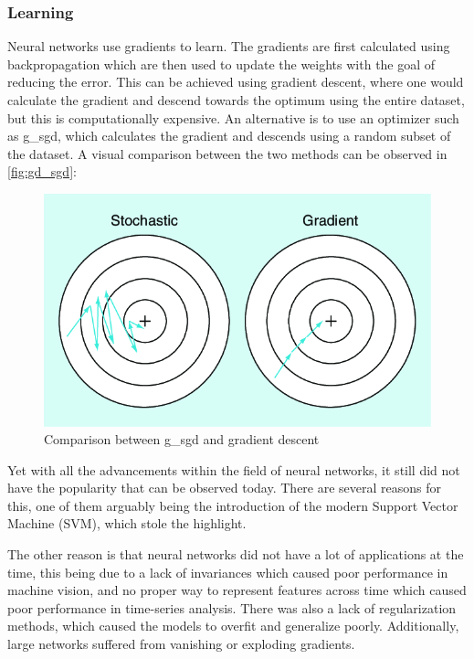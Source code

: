 \subsubsection{Learning}
Neural networks use gradients to learn. The gradients are first calculated using backpropagation which are then used to update the weights with the goal of reducing the error. This can be achieved using gradient descent, where one would calculate the gradient and descend towards the optimum using the entire dataset, but this is computationally expensive. An alternative is to use an optimizer such as \gls*{g_sgd}\cite{sgd}, which calculates the gradient and descends using a random subset of the dataset. A visual comparison between the two methods can be observed in \autoref{fig:gd_sgd}:
\begin{figure}[H]
    \centering
    \includegraphics[width=0.8\linewidth]{resources/related_works/gradient_descent.png}
    \caption{Comparison between \gls*{g_sgd} and gradient descent \cite{gradient_descent}}
    \label{fig:gd_sgd}
\end{figure}
\par
Yet with all the advancements within the field of neural networks, it still did not have the popularity that can be observed today. There are several reasons for this, one of them arguably being the introduction of the modern Support Vector Machine (SVM)\cite{svm}, which stole the highlight.
\par
The other reason is that neural networks did not have a lot of applications at the time, this being due to a lack of invariances which caused poor performance in machine vision, and no proper way to represent features across time which caused poor performance in time-series analysis. There was also a lack of regularization methods, which caused the models to overfit and generalize poorly. Additionally, large networks suffered from vanishing or exploding gradients.
\par
